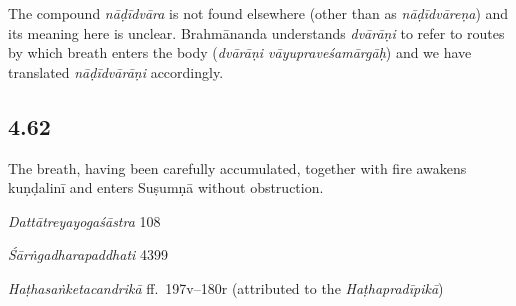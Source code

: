 \begin{ekdosis}
\begin{philcomm}[hp04_061]
The compound \emph{nāḍīdvāra} is not found elsewhere (other than as \emph{nāḍīdvāreṇa}) and its meaning here is unclear. Brahmānanda understands \emph{dvārāṇi} to refer to routes by which breath enters the body (\emph{dvārāṇi vāyupraveśamārgāḥ}) and we have translated \emph{nāḍīdvārāṇi} accordingly.
\end{philcomm}

\subsection*{4.62}
\begin{translation}[hp04_062]
The breath, having been carefully accumulated, together with fire awakens kuṇḍalinī and enters Suṣumṇā without obstruction.
\end{translation}

\begin{sources}[hp04_062]
\emph{Dattātreyayogaśāstra} 108
\begin{versinnote}
\end{versinnote}
\end{sources}

\begin{testimonia}[hp04_062]
\emph{Śārṅgadharapaddhati} 4399
\begin{versinnote}
\end{versinnote}

\emph{Haṭhasaṅketacandrikā} ff.~197v–180r (attributed to the \emph{Haṭhapradīpikā})
\begin{versinnote}
\end{versinnote}
\end{testimonia}



\end{ekdosis}
